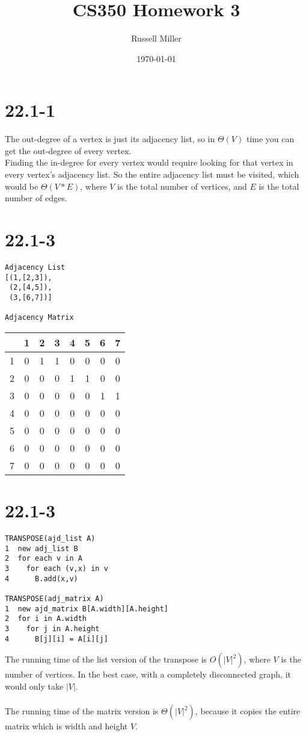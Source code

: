 \documentclass{article}
\title{CS350 Homework 3}
\author{Russell Miller}
\date{\today}
\begin{document}
\maketitle

\section*{22.1-1}
The out-degree of a vertex is just its adjacency list, so in $\Theta(V)$
time you can get the out-degree of every vertex.\\
Finding the in-degree for every vertex would require looking for that
vertex in every vertex's adjacency list. So the entire adjacency list 
must be visited, which would be $\Theta(V*E)$, where $V$ is the total
number of vertices, and $E$ is the total number of edges.\\

\section*{22.1-3}
\begin{verbatim}
Adjacency List
[(1,[2,3]),
 (2,[4,5]),
 (3,[6,7])]

Adjacency Matrix
\end{verbatim}
\begin{tabular}{|c|c c c c c c c|}
\hline
 &1&2&3&4&5&6&7\\
\hline
1&0&1&1&0&0&0&0\\
2&0&0&0&1&1&0&0\\
3&0&0&0&0&0&1&1\\
4&0&0&0&0&0&0&0\\
5&0&0&0&0&0&0&0\\
6&0&0&0&0&0&0&0\\
7&0&0&0&0&0&0&0\\
\hline
\end{tabular}

\section*{22.1-3}
\begin{verbatim}
TRANSPOSE(ajd_list A)
1  new adj_list B
2  for each v in A
3    for each (v,x) in v
4      B.add(x,v)

TRANSPOSE(adj_matrix A)
1  new ajd_matrix B[A.width][A.height]
2  for i in A.width
3    for j in A.height
4      B[j][i] = A[i][j]
\end{verbatim}
The running time of the list version of the transpose is $O(|V|^2)$, where $V$ is the number of vertices.
In the best case, with a completely disconnected graph, it would only take $|V|$.\\
\\
The running time of the matrix version is $\Theta(|V|^2)$, because it copies the entire matrix which
is width and height $V$.\\
\end{document}
